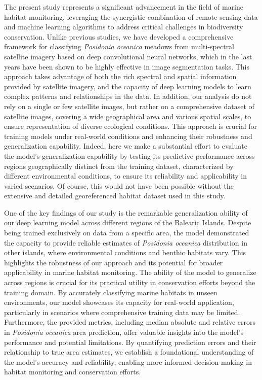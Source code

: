 The present study represents a significant advancement in the field of marine
habitat
monitoring, leveraging the synergistic combination of remote sensing data and
machine learning algorithms to address critical challenges in biodiversity
conservation. Unlike previous studies, we have developed a comprehensive
framework for classifying \textit{Posidonia oceanica} meadows from
multi-spectral satellite imagery based on deep convolutional neural networks,
which in the last years have been shown to be highly effective in image
segmentation tasks. This approach takes advantage of both the rich spectral
and spatial information provided by satellite imagery, and the capacity of deep
learning models to learn complex patterns and relationships in the data. In
addition, our analysis do not rely on a single or few satellite images, but
rather on a comprehensive dataset of satellite images, covering a wide
geographical area and various spatial scales, to ensure representation of
diverse ecological conditions. This approach is crucial for training models
under real-world conditions and enhancing their robustness and generalization
capability. Indeed, here we make a substantial effort to evaluate the model's
generalization capability by testing its predictive performance across regions
geographically distinct from the training dataset, characterized by different
environmental conditions, to ensure its reliability and applicability in varied
scenarios. Of course, this would not have been possible without the extensive
and detailed georeferenced habitat dataset used in this study.

One of the key findings of our study is the remarkable generalization ability
of our deep learning model across different regions of the Balearic Islands.
Despite being trained exclusively on data from a specific area, the model
demonstrated the capacity to provide reliable estimates of \textit{Posidonia
    oceanica} distribution in other islands, where environmental conditions and
benthic habitats vary. This highlights the robustness of our approach and its
potential for broader applicability in marine habitat monitoring. The ability
of the model to generalize across regions is crucial for its practical utility
in conservation efforts beyond the training domain. By accurately classifying
marine habitats in unseen environments, our model showcases its capacity for
real-world application, particularly in scenarios where comprehensive training
data may be limited. Furthermore, the provided metrics, including median
absolute and relative errors in \textit{Posidonia
    oceanica} area prediction, offer valuable insights into the model's
performance and potential limitations. By quantifying prediction errors and
their relationship to true area estimates, we establish a foundational
understanding of the model's accuracy and reliability, enabling more informed
decision-making in habitat monitoring and conservation efforts.

